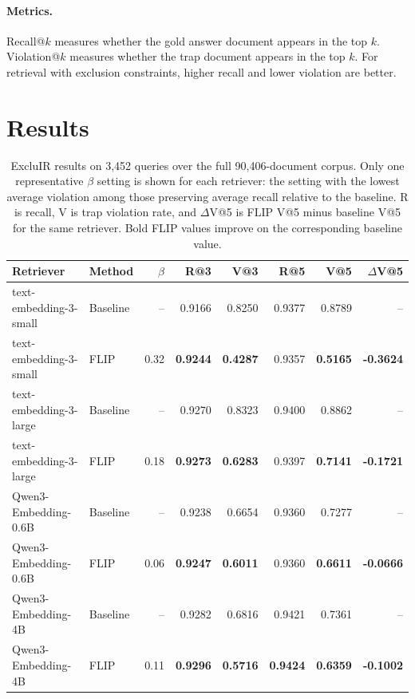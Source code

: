 \documentclass[11pt]{article}
\newcommand{\method}{FLIP\xspace}
\begin{document}
\paragraph{Metrics.}
Recall@$k$ measures whether the gold answer document appears in the top $k$.
Violation@$k$ measures whether the trap document appears in the top $k$.
For retrieval with exclusion constraints, higher recall and lower violation are better.

\section{Results}

\begin{table}[t]
\centering
\small
\begin{tabular}{llrrrrrr}
\toprule
Retriever & Method & $\beta$ & R@3 & V@3 & R@5 & V@5 & $\Delta$V@5 \\
\midrule
text-embedding-3-small & Baseline & -- & 0.9166 & 0.8250 & 0.9377 & 0.8789 & -- \\
text-embedding-3-small & \method & 0.32 & \textbf{0.9244} & \textbf{0.4287} & 0.9357 & \textbf{0.5165} & \textbf{-0.3624} \\
\midrule
text-embedding-3-large & Baseline & -- & 0.9270 & 0.8323 & 0.9400 & 0.8862 & -- \\
text-embedding-3-large & \method & 0.18 & \textbf{0.9273} & \textbf{0.6283} & 0.9397 & \textbf{0.7141} & \textbf{-0.1721} \\
\midrule
Qwen3-Embedding-0.6B & Baseline & -- & 0.9238 & 0.6654 & 0.9360 & 0.7277 & -- \\
Qwen3-Embedding-0.6B & \method & 0.06 & \textbf{0.9247} & \textbf{0.6011} & 0.9360 & \textbf{0.6611} & \textbf{-0.0666} \\
\midrule
Qwen3-Embedding-4B & Baseline & -- & 0.9282 & 0.6816 & 0.9421 & 0.7361 & -- \\
Qwen3-Embedding-4B & \method & 0.11 & \textbf{0.9296} & \textbf{0.5716} & \textbf{0.9424} & \textbf{0.6359} & \textbf{-0.1002} \\
\bottomrule
\end{tabular}
\caption{ExcluIR results on 3,452 queries over the full 90,406-document corpus. Only one representative $\beta$ setting is shown for each retriever: the setting with the lowest average violation among those preserving average recall relative to the baseline. R is recall, V is trap violation rate, and $\Delta$V@5 is \method{} V@5 minus baseline V@5 for the same retriever. Bold \method values improve on the corresponding baseline value.}
\label{tab:main-results}
\end{table}
\end{document}
